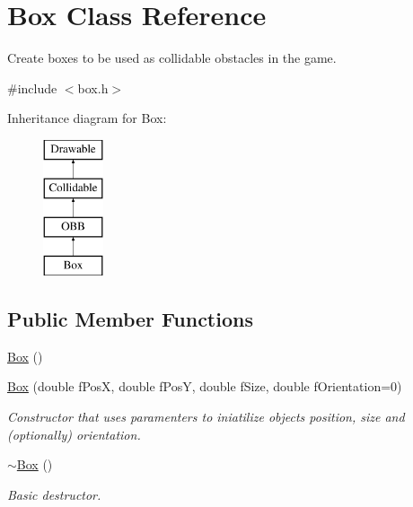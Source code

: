 \hypertarget{class_box}{}\section{Box Class Reference}
\label{class_box}


Create boxes to be used as collidable obstacles in the game.  




{\ttfamily \#include $<$box.\+h$>$}

Inheritance diagram for Box\+:\begin{figure}[H]
\begin{center}
\leavevmode
\includegraphics[height=4.000000cm]{class_box}
\end{center}
\end{figure}
\subsection*{Public Member Functions}
\begin{DoxyCompactItemize}
\item 
\hyperlink{class_box_aca78d7db44972bfa78d46b7bbc8796f6}{Box} ()
\item 
\hyperlink{class_box_abbd9e77b3e9400ef44c6d52e0682b9d9}{Box} (double f\+Pos\+X, double f\+Pos\+Y, double f\+Size, double f\+Orientation=0)
\begin{DoxyCompactList}\small\item\em Constructor that uses paramenters to iniatilize object\textquotesingle{}s position, size and (optionally) orientation. \end{DoxyCompactList}\item 
\hypertarget{class_box_a6a5e09398e85d602a046b429062fb9c2}{}\hyperlink{class_box_a6a5e09398e85d602a046b429062fb9c2}{$\sim$\+Box} ()\label{class_box_a6a5e09398e85d602a046b429062fb9c2}

\begin{DoxyCompactList}\small\item\em Basic destructor. \end{DoxyCompactList}\end{DoxyCompactItemize}
